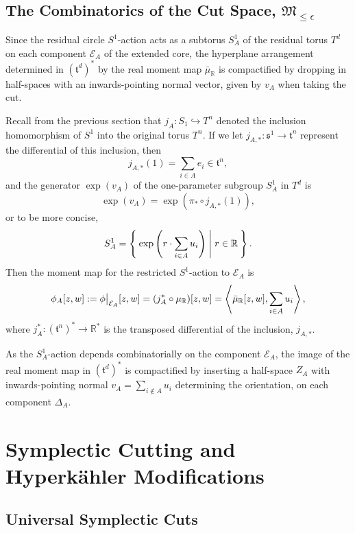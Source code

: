 \documentclass{article}
\newcommand{\ra}{\rightarrow}
\newcommand{\lbracket}{\left(}
\newcommand{\rbracket}{\right)}
\newcommand{\e}{\epsilon}
\newcommand{\RR}{\mathbb{R}}
\newcommand{\mcE}{\mathcal{E}}
\newcommand{\mft}{\mathfrak{t}}
\newcommand{\mc}[1]{\mathcal{#1}}
\newcommand{\mf}[1]{\mathfrak{#1}}
\newcommand{\mrr}{\mu_{\mathbb{R}}}
\newcommand\restr[2]{{%
		\left.\kern-\nulldelimiterspace %
		#1 %
		\vphantom{\big|} %
		\right|_{#2} %
}}
\begin{document}
	\subsection{The Combinatorics of the Cut Space, $\mf{M}_{\leq \e}$}
	
	Since the residual circle $S^{1}$-action acts as a subtorus $S_{A}^{1}$ of the residual torus $T^{d}$ on each component $\mc{E}_{A}$ of the extended core, the hyperplane arrangement determined in $(\mft^{d})^{\ast}$ by the real moment map $\bar{\mu}_{\RR}$ is compactified by dropping in half-spaces with an inwards-pointing normal vector, given by $v_{A}$ when taking the cut. 
	
	Recall from the previous section that $j_{A}: S_{1} \hookrightarrow T^{n}$ denoted the inclusion homomorphism of $S^{1}$ into the original torus $T^{n}$. If we let $j_{A, \ast}: \mf{s}^{1} \rightarrow \mft^{n}$ represent the differential of this inclusion, then
	\[
	j_{A,\ast}(1) = \sum_{i \in A} e_{i} \in \mft^{n},
	\]
	and the generator $\exp(v_{A})$ of the one-parameter subgroup $S_{A}^{1}$ in $T^{d}$ is
	\[
	\exp(v_{A}) = \exp\lbracket \pi_{\ast} \circ j_{A, \ast}(1) \rbracket,
	\]
	or to be more concise,
	\[
	S_{A}^{1} = \Set{ \exp \lbracket r \cdot \sum_{i \in A} u_{i} \rbracket | r \in \RR }.
	\]
	Then the moment map for the restricted $S^{1}$-action to $\mcE_{A}$ is
	\begin{equation*}
		\phi_{A}[z,w] := \restr{\phi}{\mcE_{A}} [z,w] =  (j_{A}^{\ast} \circ \mrr)[z,w] = \left\langle \bar{\mu}_{\RR}[z,w], \sum_{i\in A} u_{i} \right\rangle,
	\end{equation*}
	where $j_{A}^{\ast} : (\mft^{n})^{\ast} \ra \RR^{\ast}$ is the transposed differential of the inclusion, $j_{A, \ast}$.
	
	As the $S_{A}^{1}$-action depends combinatorially on the component $\mcE_{A}$, the image of the real moment map in $(\mft^{d})^{\ast}$ is compactified by inserting a half-space $Z_{A}$ with inwards-pointing normal $v_{A} = \sum_{i \not\in A}u_{i}$ determining the orientation, on each component $\Delta_{A}$.
	
	\section{Symplectic Cutting and Hyperk{\"a}hler Modifications}
	
	\subsection{Universal Symplectic Cuts}
	
\end{document}
